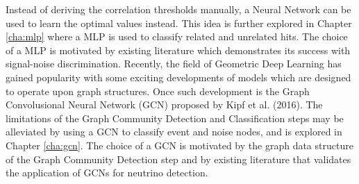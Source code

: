 Instead of deriving the correlation thresholds manually, a Neural
Network can be used to learn the optimal values instead. This idea is
further explored in Chapter \ref{cha:mlp} where a MLP is used to
classify related and unrelated hits. The choice of a MLP is motivated
by existing literature which demonstrates its success with
signal-noise discrimination. Recently, the field of Geometric Deep
Learning has gained popularity with some exciting developments of
models which are designed to operate upon graph structures. Once such
development is the Graph Convolusional Neural Network (GCN) proposed
by Kipf et al. (2016). The limitations of the Graph Community
Detection and Classification steps may be alleviated by using a GCN to
classify event and noise nodes, and is explored in Chapter
\ref{cha:gcn}. The choice of a GCN is motivated by the graph data
structure of the Graph Community Detection step and by existing
literature that validates the application of GCNs for neutrino
detection.
